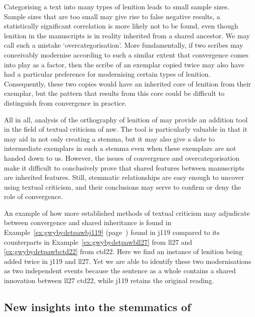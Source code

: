 Categorising a text into many types of lenition leads to small sample sizes. Sample sizes that are too small may give rise to false negative results, \ie a statistically significant correlation is more likely not to be found, even though lenition in the manuscripts is in reality inherited from a shared ancestor. We may call such a mistake `overcategorisation'. More fundamentally, if two scribes may conceivably modernise according to such a similar extent that convergence comes into play as a factor, then the scribe of an exemplar copied twice may also have had a particular preference for modernising certain types of lenition. Consequently, these two copies would have an inherited core of lenition from their exemplar, but the pattern that results from this core could be difficult to distinguish from convergence in practice.

All in all, analysis of the orthography of lenition of  may provide an addition tool in the field of textual criticism of \gls{mw}. The tool is particularly valuable in that it may aid in not only creating a stemma, but it may also give a date to intermediate exemplars in such a stemma even when these exemplars are not handed down to us. However, the issues of convergence and overcategorisation make it difficult to conclusively prove that shared features between manuscripts are inherited features. Still, stemmatic relationships are easy enough to uncover using textual criticism, and their conclusions may serve to confirm or deny the role of convergence.

An example of how more established methods of textual criticism may adjudicate between convergence and shared inheritance is  found in Example~\ref{ex:gwybydetpawbj119} (page~\pageref{ex:gwybydetpawbj119}) found in \gls{j119} compared to its counterparts in Example~\ref{ex:gwybydetpawbll27} from \gls{ll27} and \ref{ex:gwybydetpawbctd22} from \gls{ctd22}. Here we find an instance of lenition being added twice in \gls{j119} and \gls{ll27}. Yet we are able to identify these two modernisations as two independent events  because the sentence as a whole contains a shared innovation between \gls{ll27} \gls{ctd22}, while \gls{j119} retains the original reading. 

\subsection{New insights into the stemmatics of }
\label{sec:new-insights-into}


